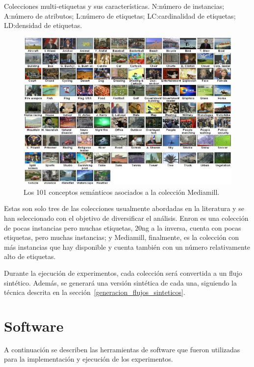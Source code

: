 \begin{table}[htbp]
	\centering
	
	\caption[Colecciones multi-etiquetas y sus características.]{Colecciones
		multi-etiquetas y sus características. N:\@ número de
		instancias; A:\@ número de atributos; L:\@ número de etiquetas; LC:\@ cardinalidad
		de etiquetas; LD:\@ densidad de etiquetas.}
	\label{tab:datasets}
\end{table}

\begin{figure}
	\includegraphics[width=.9\linewidth]{figures/mediamill.jpg}
	\centering
	\caption{Los 101 conceptos semánticos asociados a la colección
		Mediamill.}
	\label{fig:mediamill}
\end{figure}

Estas son solo tres de las colecciones usualmente abordadas en la literatura y
se han seleccionado con el objetivo de diversificar el análisis. Enron es una
colección de pocas instancias pero muchas etiquetas, 20ng a la inversa, cuenta
con pocas etiquetas, pero muchas instancias; y Mediamill, finalmente, es la
colección con más instancias que hay disponible y cuenta también con un número
relativamente alto de etiquetas.

Durante la ejecución de experimentos, cada colección será convertida a un flujo
sintético. Además, se generará una versión sintética de cada una, siguiendo la
técnica descrita en la sección~\ref{generacion_flujos_sinteticos}.

\section{Software}

A continuación se describen las herramientas de software que fueron utilizadas
para la implementación y ejecución de los experimentos.

